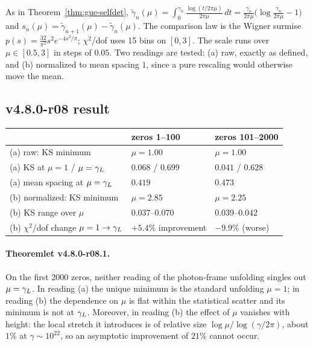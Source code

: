 As in Theorem~\ref{thm:gue-selfdet},
\(\tilde\gamma_n(\mu)=\int_0^{\gamma_n}\frac{\log(t/2\pi\mu)}{2\pi\mu}\,dt
=\frac{\gamma_n}{2\pi\mu}\bigl(\log\frac{\gamma_n}{2\pi\mu}-1\bigr)\) and
\(s_n(\mu)=\tilde\gamma_{n+1}(\mu)-\tilde\gamma_n(\mu)\).  The comparison law is the Wigner surmise
\(p(s)=\frac{32}{\pi^2}s^2e^{-4s^2/\pi}\); \(\chi^2\)/dof uses 15 bins on \([0,3]\).  The scale runs over
\(\mu\in[0.5,3]\) in steps of \(0.05\).  Two readings are tested: (a) raw, exactly as defined, and
(b) normalized to mean spacing \(1\), since a pure rescaling would otherwise move the mean.

\subsection*{v4.8.0-r08 result}
\label{subsec:v480-r08-result}

\begin{center}
\small
\begin{tabular}{@{}>{\raggedright\arraybackslash}p{}>{\raggedright\arraybackslash}p{}>{\raggedright\arraybackslash}p{}@{}}
\toprule
 & zeros 1--100 & zeros 101--2000\\
\midrule
(a) raw: KS minimum & \(\mu=1.00\) & \(\mu=1.00\)\\
(a) KS at \(\mu=1\) / \(\mu=\gamma_L\) & \(0.068\) / \(0.699\) & \(0.041\) / \(0.628\)\\
(a) mean spacing at \(\mu=\gamma_L\) & \(0.419\) & \(0.473\)\\
(b) normalized: KS minimum & \(\mu=2.85\) & \(\mu=2.25\)\\
(b) KS range over \(\mu\) & \(0.037\)--\(0.070\) & \(0.039\)--\(0.042\)\\
(b) \(\chi^2\)/dof change \(\mu=1\to\gamma_L\) & \(+5.4\%\) improvement & \(-9.9\%\) (worse)\\
\bottomrule
\end{tabular}
\end{center}

\paragraph{Theoremlet v4.8.0-r08.1.}
On the first 2000 zeros, neither reading of the photon-frame unfolding singles out \(\mu=\gamma_L\).
In reading (a) the unique minimum is the standard unfolding \(\mu=1\); in reading (b) the
dependence on \(\mu\) is flat within the statistical scatter and its minimum is not at \(\gamma_L\).
Moreover, in reading (b) the effect of \(\mu\) vanishes with height: the local stretch it introduces
is of relative size \(\log\mu/\log(\gamma/2\pi)\), about \(1\%\) at \(\gamma\sim10^{22}\), so an
asymptotic improvement of \(21\%\) cannot occur.


